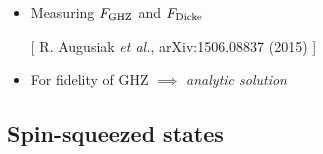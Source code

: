 \documentclass{beamer}
\newcommand{\citate}[1]{{\footnotesize{\color{gray}[ #1 ]}}

	}
\begin{document}
		\begin{frame}
			\begin{itemize}
				\item<1-> Measuring $F_{\rm GHZ}$ and $F_{\rm Dicke}$
				
				\citate{R. Augusiak {\it et al.}, arXiv:1506.08837 (2015)}
				\vspace{10px}

				\item<3-> For fidelity of GHZ $\implies$ \emph{\color{blue}analytic solution}
			\end{itemize}
		\end{frame}

	\subsection{Spin-squeezed states}
\end{document}
